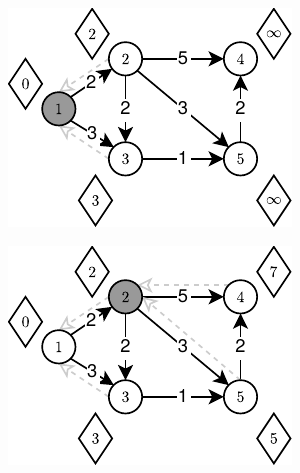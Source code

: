 \begin{figure}[!htbp]
	\centering
	\null\hfill
	\begin{subfigure}[b]{0.19\textwidth}
		\includegraphics[width=\textwidth]{Chapter_II/TOPOLOGIC-SHORTEST-PATH-Example/a.pdf}
		\caption{}
		\label{fig:exampleTopologicalShotrestPath:a}
	\end{subfigure}
	\hfill
	\begin{subfigure}[b]{0.19\textwidth}
		\includegraphics[width=\textwidth]{Chapter_II/TOPOLOGIC-SHORTEST-PATH-Example/b.pdf}
		\caption{}
		\label{fig:exampleTopologicalShotrestPath:b}
	\end{subfigure}
	\hfill
	\begin{subfigure}[b]{0.19\textwidth}

\end{subfigure}
\end{figure}
